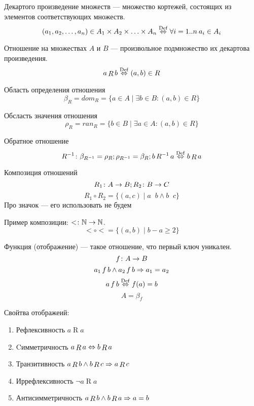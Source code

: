 \begin{Def}
Декартого произведение множеств --- множество кортежей, состоящих из элементов соответствующих множеств.
$$ \left(a_1, a_2, \ldots, a_n\right) \in A_1 \times A_2 \times \ldots \times A_n \stackrel{\mathrm{Def}}{\Leftrightarrow} \forall i=1..n\: a_i \in A_i $$
\end{Def}
\begin{Def}
Отношение на множествах $A$ и $B$ --- произвольное подмножество их декартова произведения.
$$ a \mathop{R} b \stackrel{\mathrm{Def}}{\Leftrightarrow} (a, b) \in R $$
\end{Def}
\begin{Def}
Область определения отношения 
$$ \beta_R = dom_R = \{a \in A \mid \exists b \in B\colon (a,b) \in R\} $$
\end{Def}
\begin{Def}
Обсласть значения отношения 
$$ \rho_R = ran_R =\{b \in B \mid \exists a \in A\colon (a, b) \in R\}$$
\end{Def}
\begin{Def}
Обратное отношение
$$R^{-1} \colon \beta_{R^{-1}} = \rho_R; \rho_{R^{-1}} = \beta_R; b \mathop{R^{-1}} a \stackrel{\mathrm{Def}}{\Leftrightarrow} b \mathop{R} a$$
\end{Def}
\begin{Def}
Композиция отношений
$$ R_1\colon A \rightarrow B; R_2\colon B \rightarrow C $$
$$ R_1 \circ R_2 = \{(a, c) \mid a \mathop{R_1} b \land b \mathop{R_2} c\} $$
Про значок --- его использовать не будем
\end{Def}

Пример композиции: $<\colon \mathbb{N} \rightarrow \mathbb{N}$. $$< \circ < = \{(a, b) \mid b - a \geqslant 2\}$$

\begin{Def}
Функция (отображение) --- такое отношение, что первый ключ уникален.
$$f\colon A \rightarrow B$$
$$ a_1 \mathop{f} b \land a_2 \mathop{f} b \Rightarrow a_1 = a_2 $$
$$ a \mathop{f} b \stackrel{\mathrm{Def}}{\Leftrightarrow} f(a) = b $$
$$ A = \beta_f$$
\end{Def}

\begin{Def}Свойтва отображеий:
\begin{enumerate}
\item Рефлексивность $a \mathop{R} a$
\item Cимметричность $a \mathop{R} a \Leftrightarrow b \mathop{R} a$
\item Транзитивность $a \mathop{R} b \land b \mathop{R} c \Rightarrow a \mathop{R} c$
\item Иррефлексивность $\lnot a \mathop{R} a$
\item Антисимметричность $a \mathop{R} b \land b \mathop{R} a \Rightarrow a = b$
\end{enumerate}
\end{Def}

